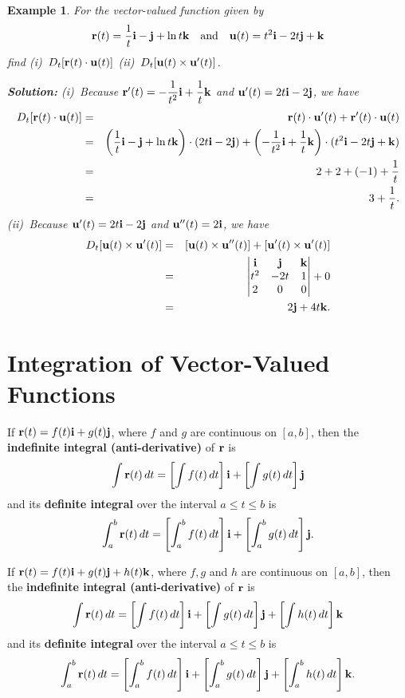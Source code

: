 \documentclass[titlepage,a4paper,12pt]{report}
\newtheorem{example}{Example}[section]
\begin{document}
\begin{example}
For the vector-valued function given by 
\[{\bf{r}}(t)=\dfrac{1}{t}{\bf{i}}-{\bf{j}}+\ln t {\bf{k}} \quad \mbox{and} \quad {\bf{u}}(t)=t^2{\bf{i}}-2t{\bf{j}}+{\bf{k}}\] find (i)\, $D_t[{\bf{r}}(t)\cdot {\bf{u}}(t)]$ \quad (ii)\, $D_t[{\bf{u}}(t) \times {\bf{u}}'(t)]$.

\noindent \textbf{Solution:} (i)\, Because ${\bf{r}}'(t)=-\dfrac{1}{t^2}{\bf{i}}+\dfrac{1}{t}{\bf{k}}$ and ${\bf{u}}'(t)=2t{\bf{i}}-2{\bf{j}}$, we have
\begin{eqnarray*}
D_t[{\bf{r}}(t)\cdot {\bf{u}}(t)] &=& {\bf{r}}(t) \cdot {\bf{u}}'(t)+{\bf{r}}'(t)\cdot {\bf{u}}(t)\\
&=& \left(\dfrac{1}{t}{\bf{i}}-{\bf{j}}+\ln t {\bf{k}} \right) \cdot (2t{\bf{i}}-2{\bf{j}}) +\left(-\dfrac{1}{t^2}{\bf{i}}+\dfrac{1}{t}{\bf{k}}\right) \cdot (t^2{\bf{i}}-2t{\bf{j}}+{\bf{k}})\\
&=& 2+2+(-1)+\dfrac{1}{t}\\
&=& 3+\dfrac{1}{t}.
\end{eqnarray*}
(ii)\, Because ${\bf{u}}'(t)=2t{\bf{i}}-2{\bf{j}}$ and ${\bf{u}}''(t)=2{\bf{i}}$, we have 
\begin{eqnarray*}
D_t[{\bf{u}}(t) \times {\bf{u}}'(t)] &=& [{\bf{u}}(t) \times {\bf{u}}''(t)] +[{\bf{u}}'(t)\times {\bf{u}}'(t)]\\
&=& \begin{vmatrix}
{\bf{i}} & {\bf{j}} & {\bf{k}} \\
t^2 & -2t & 1 \\
2 & 0 & 0 
\end{vmatrix} +0 \\
&=& 2{\bf{j}} +4t{\bf{k}}.
\end{eqnarray*}
\end{example}
\section{Integration of Vector-Valued Functions}
If ${\bf{r}}(t)=f(t){\bf{i}}+g(t){\bf{j}}$, where $f$ and $g$ are continuous on $[a,b]$, then the \textbf{indefinite integral (anti-derivative)} of ${\bf{r}}$ is 
\[\int {\bf{r}}(t)\, dt =\left[ \int f(t)\, dt\right]{\bf{i}}+\left[\int g(t)\, dt\right]{\bf{j}}\] and its \textbf{definite integral} over the interval $a\leq t \leq b$ is 
\[\int _a^b {\bf{r}}(t)\, dt =\left[\int _a^b f(t)\, dt\right]{\bf{i}}+\left[\int _a^b g(t)\, dt\right]{\bf{j}}.\]

\noindent If ${\bf{r}}(t)=f(t){\bf{i}}+g(t){\bf{j}}+h(t){\bf{k}}$, where $f,g$ and $h$ are continuous on $[a,b]$, then the \textbf{indefinite integral (anti-derivative)} of ${\bf{r}}$ is 
\[\int {\bf{r}}(t)\, dt =\left[ \int f(t)\, dt\right]{\bf{i}}+\left[\int g(t)\, dt\right]{\bf{j}}+\left[ \int h(t)\, dt\right]{\bf{k}}\] and its \textbf{definite integral} over the interval $a\leq t \leq b$ is 
\[\int _a^b {\bf{r}}(t)\, dt =\left[\int _a^b f(t)\, dt\right]{\bf{i}}+\left[\int _a^b g(t)\, dt\right]{\bf{j}}+\left[\int _a^b h(t)\, dt\right]{\bf{k}}.\]
\end{document}
